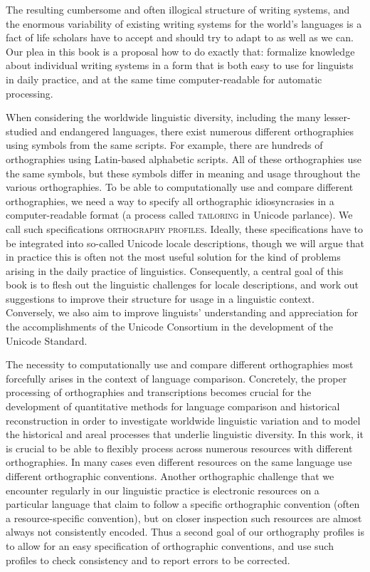 The resulting cumbersome and often illogical structure of writing systems, and
the enormous variability of existing writing systems for the world's languages
is a fact of life scholars have to accept and should try to adapt to as well as
we can. Our plea in this book is a proposal how to do exactly that: formalize 
knowledge about individual writing systems in a form that is both easy to use 
for linguists in daily practice, and at the same time computer-readable for 
automatic processing.

When considering the worldwide linguistic diversity, including the many
lesser-studied and endangered languages, there exist numerous different
orthographies using symbols from the same scripts. For example, there are
hundreds of orthographies using Latin-based alphabetic scripts. All of these
orthographies use the same symbols, but these symbols differ in meaning and
usage throughout the various orthographies. To be able to computationally use
and compare different orthographies, we need a way to specify all orthographic
idiosyncrasies in a computer-readable format (a process called
\textsc{tailoring} in Unicode parlance). We call such specifications
\textsc{orthography profiles}. Ideally, these specifications have to be
integrated into so-called Unicode locale descriptions, though we will argue that
in practice this is often not the most useful solution for the kind of problems
arising in the daily practice of linguistics. Consequently, a central goal of
this book is to flesh out the linguistic challenges for locale descriptions,
and work out suggestions to improve their structure for usage in a linguistic
context. Conversely, we also aim to improve linguists' understanding and
appreciation for the accomplishments of the Unicode Consortium in the
development of the Unicode Standard.

The necessity to computationally use and compare different orthographies most
forcefully arises in the context of language comparison. Concretely, the proper
processing of orthographies and transcriptions becomes crucial for the
development of quantitative methods for language comparison and historical
reconstruction in order to investigate worldwide linguistic variation and to
model the historical and areal processes that underlie linguistic
diversity. In this work, it is crucial to be able to flexibly process across numerous
resources with different orthographies. In many cases even different resources
on the same language use different orthographic conventions. Another
orthographic challenge that we encounter regularly in our linguistic practice is
electronic resources on a particular language that claim to follow a specific
orthographic convention (often a resource-specific convention), but on closer
inspection such resources are almost always not consistently encoded. Thus a
second goal of our orthography profiles is to allow for an easy specification of
orthographic conventions, and use such profiles to check consistency and to
report errors to be corrected.

